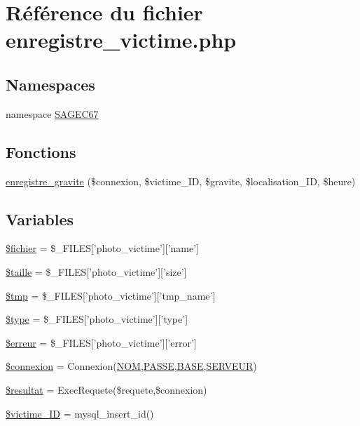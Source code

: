 \hypertarget{enregistre__victime_8php}{
\section{R\'{e}f\'{e}rence du fichier enregistre\_\-victime.php}
\label{enregistre__victime_8php}
}
\subsection*{Namespaces}
\begin{CompactItemize}
\item 
namespace \hyperlink{namespaceSAGEC67}{SAGEC67}
\end{CompactItemize}
\subsection*{Fonctions}
\begin{CompactItemize}
\item 
\hyperlink{enregistre__victime_8php_a8}{enregistre\_\-gravite} (\$connexion, \$victime\_\-ID, \$gravite, \$localisation\_\-ID, \$heure)
\end{CompactItemize}
\subsection*{Variables}
\begin{CompactItemize}
\item 
\hyperlink{enregistre__victime_8php_a0}{\$fichier} = \$\_\-FILES\mbox{[}'photo\_\-victime'\mbox{]}\mbox{[}'name'\mbox{]}
\item 
\hyperlink{enregistre__victime_8php_a1}{\$taille} = \$\_\-FILES\mbox{[}'photo\_\-victime'\mbox{]}\mbox{[}'size'\mbox{]}
\item 
\hyperlink{enregistre__victime_8php_a2}{\$tmp} = \$\_\-FILES\mbox{[}'photo\_\-victime'\mbox{]}\mbox{[}'tmp\_\-name'\mbox{]}
\item 
\hyperlink{enregistre__victime_8php_a3}{\$type} = \$\_\-FILES\mbox{[}'photo\_\-victime'\mbox{]}\mbox{[}'type'\mbox{]}
\item 
\hyperlink{enregistre__victime_8php_a4}{\$erreur} = \$\_\-FILES\mbox{[}'photo\_\-victime'\mbox{]}\mbox{[}'error'\mbox{]}
\item 
\hyperlink{enregistre__victime_8php_a5}{\$connexion} = Connexion(\hyperlink{pma__connect_8php_a0}{NOM},\hyperlink{pma__connect_8php_a1}{PASSE},\hyperlink{pma__connect_8php_a3}{BASE},\hyperlink{pma__connect_8php_a2}{SERVEUR})
\item 
\hyperlink{enregistre__victime_8php_a6}{\$resultat} = Exec\-Requete(\$requete,\$connexion)
\item 
\hyperlink{enregistre__victime_8php_a7}{\$victime\_\-ID} = mysql\_\-insert\_\-id()
\end{CompactItemize}


